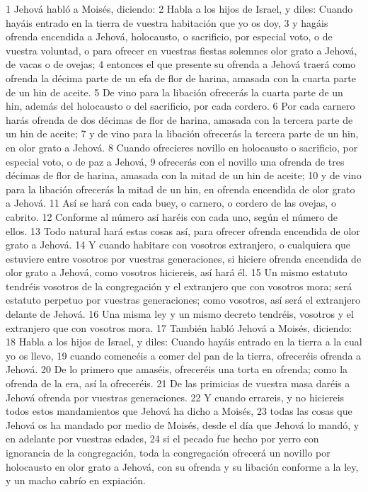 1 Jehová habló a Moisés, diciendo:
2 Habla a los hijos de Israel, y diles: Cuando hayáis entrado en la tierra de vuestra habitación que yo os doy,
3 y hagáis ofrenda encendida a Jehová, holocausto, o sacrificio, por especial voto, o de vuestra voluntad, o para ofrecer en vuestras fiestas solemnes olor grato a Jehová, de vacas o de ovejas;
4 entonces el que presente su ofrenda a Jehová traerá como ofrenda la décima parte de un efa   de flor de harina, amasada con la cuarta parte de un hin de aceite.
5 De vino para la libación ofrecerás la cuarta parte de un hin, además del holocausto o del sacrificio, por cada cordero.
6 Por cada carnero harás ofrenda de dos décimas de flor de harina, amasada con la tercera parte de un hin   de aceite;
7 y de vino para la libación ofrecerás la tercera parte de un hin,  en olor grato a Jehová.
8 Cuando ofrecieres novillo en holocausto o sacrificio, por especial voto, o de paz a Jehová,
9 ofrecerás con el novillo una ofrenda de tres décimas de flor de harina, amasada con la mitad de un hin   de aceite;
10 y de vino para la libación ofrecerás la mitad de un hin, en ofrenda encendida de olor grato a Jehová.
11 Así se hará con cada buey, o carnero, o cordero de las ovejas, o cabrito.
12 Conforme al número así haréis con cada uno, según el número de ellos.
13 Todo natural hará estas cosas así, para ofrecer ofrenda encendida de olor grato a Jehová.
14 Y cuando habitare con vosotros extranjero, o cualquiera que estuviere entre vosotros por vuestras generaciones, si hiciere ofrenda encendida de olor grato a Jehová, como vosotros hiciereis, así hará él.
15 Un mismo estatuto tendréis vosotros de la congregación y el extranjero que con vosotros mora; será estatuto perpetuo por vuestras generaciones; como vosotros, así será el extranjero delante de Jehová.
16 Una misma ley y un mismo decreto tendréis, vosotros y el extranjero que con vosotros mora.
17 También habló Jehová a Moisés, diciendo:
18 Habla a los hijos de Israel, y diles: Cuando hayáis entrado en la tierra a la cual yo os llevo,
19 cuando comencéis a comer del pan de la tierra, ofreceréis ofrenda a Jehová.
20 De lo primero que amaséis, ofreceréis una torta en ofrenda; como la ofrenda de la era, así la ofreceréis.
21 De las primicias de vuestra masa daréis a Jehová ofrenda por vuestras generaciones.
22 Y cuando errareis, y no hiciereis todos estos mandamientos que Jehová ha dicho a Moisés,
23 todas las cosas que Jehová os ha mandado por medio de Moisés, desde el día que Jehová lo mandó, y en adelante por vuestras edades,
24 si el pecado fue hecho por yerro con ignorancia de la congregación, toda la congregación ofrecerá un novillo por holocausto en olor grato a Jehová, con su ofrenda y su libación conforme a la ley, y un macho cabrío en expiación.
